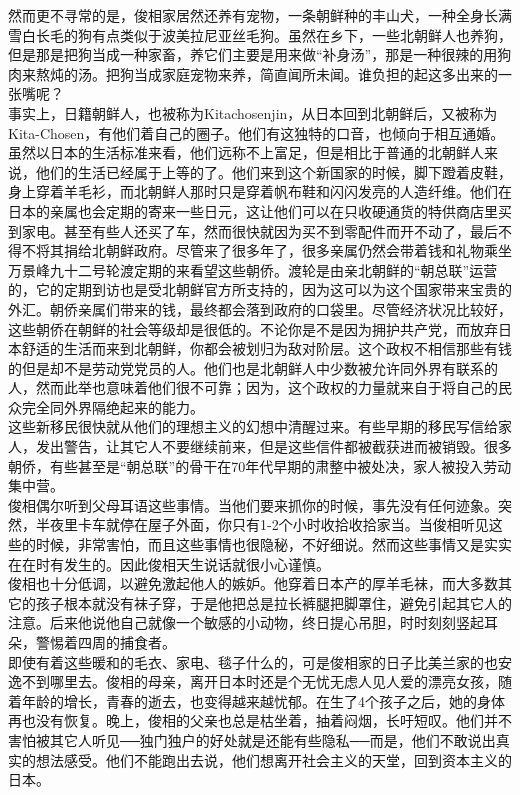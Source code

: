 \begin{multicols}{\theparacolNo}
然而更不寻常的是，俊相家居然还养有宠物，一条朝鲜种的丰山犬，一种全身长满雪白长毛的狗有点类似于波美拉尼亚丝毛狗。虽然在乡下，一些北朝鲜人也养狗，但是那是把狗当成一种家畜，养它们主要是用来做“补身汤”，那是一种很辣的用狗肉来熬炖的汤。把狗当成家庭宠物来养，简直闻所未闻。谁负担的起这多出来的一张嘴呢？\\

事实上，日籍朝鲜人，也被称为Kitachosenjin，从日本回到北朝鲜后，又被称为Kita-Chosen，有他们着自己的圈子。他们有这独特的口音，也倾向于相互通婚。虽然以日本的生活标准来看，他们远称不上富足，但是相比于普通的北朝鲜人来说，他们的生活已经属于上等的了。他们来到这个新国家的时候，脚下蹬着皮鞋，身上穿着羊毛衫，而北朝鲜人那时只是穿着帆布鞋和闪闪发亮的人造纤维。他们在日本的亲属也会定期的寄来一些日元，这让他们可以在只收硬通货的特供商店里买到家电。甚至有些人还买了车，然而很快就因为买不到零配件而开不动了，最后不得不将其捐给北朝鲜政府。尽管来了很多年了，很多亲属仍然会带着钱和礼物乘坐万景峰九十二号轮渡定期的来看望这些朝侨。渡轮是由亲北朝鲜的“朝总联”运营的，它的定期到访也是受北朝鲜官方所支持的，因为这可以为这个国家带来宝贵的外汇。朝侨亲属们带来的钱，最终都会落到政府的口袋里。尽管经济状况比较好，这些朝侨在朝鲜的社会等级却是很低的。不论你是不是因为拥护共产党，而放弃日本舒适的生活而来到北朝鲜，你都会被划归为敌对阶层。这个政权不相信那些有钱的但是却不是劳动党党员的人。他们也是北朝鲜人中少数被允许同外界有联系的人，然而此举也意味着他们很不可靠；因为，这个政权的力量就来自于将自己的民众完全同外界隔绝起来的能力。\\

这些新移民很快就从他们的理想主义的幻想中清醒过来。有些早期的移民写信给家人，发出警告，让其它人不要继续前来，但是这些信件都被截获进而被销毁。很多朝侨，有些甚至是“朝总联”的骨干在70年代早期的肃整中被处决，家人被投入劳动集中营。\\

俊相偶尔听到父母耳语这些事情。当他们要来抓你的时候，事先没有任何迹象。突然，半夜里卡车就停在屋子外面，你只有1-2个小时收拾收拾家当。当俊相听见这些的时候，非常害怕，而且这些事情也很隐秘，不好细说。然而这些事情又是实实在在时有发生的。因此俊相天生说话就很小心谨慎。\\

俊相也十分低调，以避免激起他人的嫉妒。他穿着日本产的厚羊毛袜，而大多数其它的孩子根本就没有袜子穿，于是他把总是拉长裤腿把脚罩住，避免引起其它人的注意。后来他说他自己就像一个敏感的小动物，终日提心吊胆，时时刻刻竖起耳朵，警惕着四周的捕食者。\\

即使有着这些暖和的毛衣、家电、毯子什么的，可是俊相家的日子比美兰家的也安逸不到哪里去。俊相的母亲，离开日本时还是个无忧无虑人见人爱的漂亮女孩，随着年龄的增长，青春的逝去，也变得越来越忧郁。在生了4个孩子之后，她的身体再也没有恢复。晚上，俊相的父亲也总是枯坐着，抽着闷烟，长吁短叹。他们并不害怕被其它人听见──独门独户的好处就是还能有些隐私──而是，他们不敢说出真实的想法感受。他们不能跑出去说，他们想离开社会主义的天堂，回到资本主义的日本。\\


\end{multicols}

